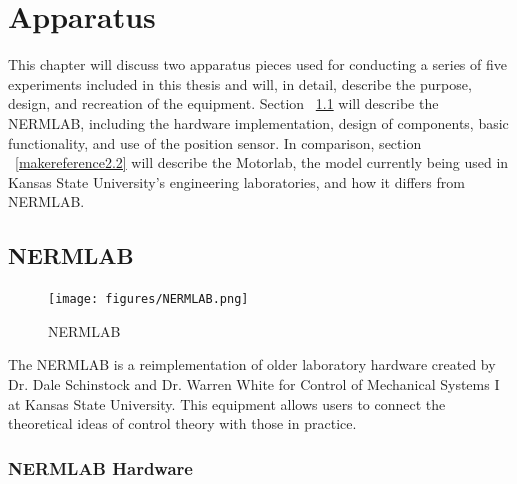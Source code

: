 
\cleardoublepage


\chapter{Apparatus}
\label{chp2}
This chapter will discuss two apparatus pieces used for conducting a series of five experiments included in this thesis and will, in detail, describe the purpose, design, and recreation of the equipment. Section ~\ref{makereference2.1} will describe the NERMLAB, including the hardware implementation, design of components, basic functionality, and use of the position sensor. In comparison, section ~\ref{makereference2.2} will describe the Motorlab, the model currently being used in Kansas State University's engineering laboratories, and how it differs from NERMLAB. 

\section{NERMLAB}
\label{makereference2.1} 

\begin{figure}[htb]%
	\begin{center}
		\texttt{[image: figures/NERMLAB.png]}
		
		\caption[NERMLAB]{NERMLAB}
		
		\label{NERMLAB_picture}
	\end{center}
\end{figure}

The NERMLAB is a reimplementation of older laboratory hardware created by Dr. Dale Schinstock and Dr. Warren White for Control of Mechanical Systems I at Kansas State University. This equipment allows users to connect the theoretical ideas of control theory with those in practice.

\subsection{NERMLAB Hardware}
\label{makereference2.1.1} 

